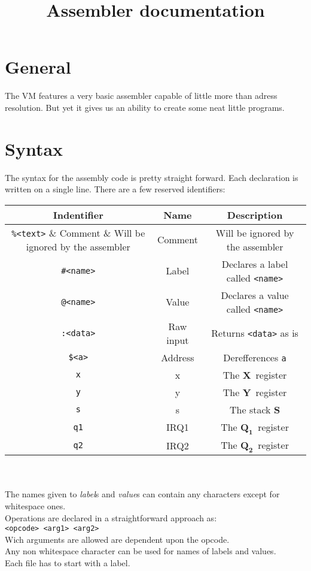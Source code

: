 \documentclass{article}
\newcommand{\V}{\verb}
\newcommand{\x}{$\textbf{X}$}
\newcommand{\y}{$\textbf{Y}$}
\newcommand{\s}{$\textbf{S}$}
\newcommand{\q}{$\textbf{Q}_{\textbf{1}}$}
\newcommand{\qq}{$\textbf{Q}_{\textbf{2}}$}
\begin{document}
\title{Assembler documentation}

\section{General}
The VM features a very basic assembler capable of little more than adress
resolution. But yet it gives us an ability to create some neat little programs.
\section{Syntax}
The syntax for the assembly code is pretty straight forward. Each declaration is
written on a single line. There are a few reserved identifiers:

\begin{tabular}{|c | c| c |}
\hline
Indentifier & Name & Description\\
\hline
\V+%
\hline
\V+#<name>+ & Label & Declares a label called \V+<name>+ \\
\hline
\V+@<name>+ & Value & Declares a value called \V+<name>+\\
\hline
\V+:<data>+ & Raw input & Returns \V+<data>+ as is \\
\hline
\verb+$<a>+ & Address & Derefferences \V+a+\\
\hline
\V+x+ & x & The \x \ register \\
\hline
\V+y+ & y & The \y \ register \\
\hline
\V+s+ & s & The stack \s \\
\hline
\V+q1+ & IRQ1 & The \q \ register\\
\hline
\V+q2+ & IRQ2 & The \qq \ register\\
\hline
\end{tabular}
\\
\\
The names given to \emph{label}s and \emph{value}s can contain any characters except for
whitespace ones.\\
Operations are declared in a straightforward approach as:\\
\V+<opcode> <arg1> <arg2>+ \\
Wich arguments are allowed are dependent upon the opcode.\\
Any non whitespace character can be used for names of labels and values.\\
Each file has to start with a label.
\end{document}
